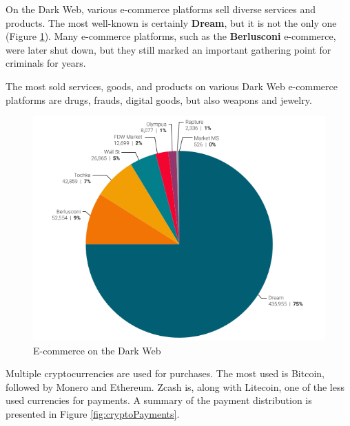 \noindent On the Dark Web, various e-commerce platforms sell diverse services and products. The most well-known is certainly \textbf{Dream}, but it is not the only one (Figure \ref{fig:e-commerce}). Many e-commerce platforms, such as the \textbf{Berlusconi} e-commerce, were later shut down, but they still marked an important gathering point for criminals for years.

\noindent The most sold services, goods, and products on various Dark Web e-commerce platforms are drugs, frauds, digital goods, but also weapons and jewelry.

\begin{figure}[!ht]
    \centering
    \includegraphics[width=1\linewidth]{img/eCommerce.png}
    \caption{E-commerce on the Dark Web}
    \label{fig:e-commerce}
\end{figure}

\noindent Multiple cryptocurrencies are used for purchases. The most used is Bitcoin, followed by Monero and Ethereum. Zcash is, along with Litecoin, one of the less used currencies for payments. A summary of the payment distribution is presented in Figure \ref{fig:cryptoPayments}.

